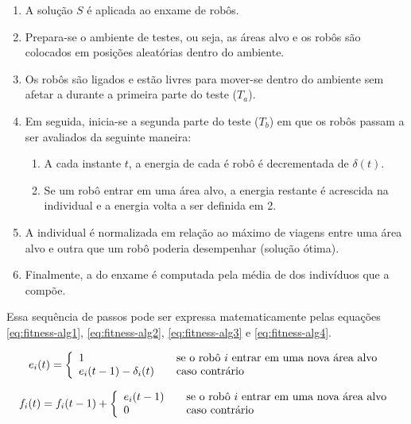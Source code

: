 \begin{enumerate}
    \item A solução $S$ é aplicada ao enxame de robôs.
    \item Prepara-se o ambiente de testes, ou seja, as áreas alvo e os robôs são colocados em posições aleatórias dentro do ambiente.
    \item Os robôs são ligados e estão livres para mover-se dentro do ambiente sem afetar a \fitness durante a primeira parte do teste ($T_{a}$).
    \item Em seguida, inicia-se a segunda parte do teste ($T_{b}$) em que os robôs passam a ser avaliados da seguinte maneira:
    \begin{enumerate}
        \item A cada instante $t$, a energia de cada é robô é decrementada de $\delta (t)$.
        \item Se um robô entrar em uma área alvo, a energia restante é acrescida na \fitness individual e a energia volta a ser definida em 2.
    \end{enumerate}
    \item A \fitness individual é normalizada em relação ao máximo de viagens entre uma área alvo e outra que um robô poderia desempenhar (solução ótima).
    \item Finalmente, a \fitness do enxame é computada pela média de \fitness dos indivíduos que a compõe.
\end{enumerate}

Essa sequência de passos pode ser expressa matematicamente pelas equações \ref{eq:fitness-alg1}, \ref{eq:fitness-alg2}, \ref{eq:fitness-alg3} e \ref{eq:fitness-alg4}.

\begin{equation}
\label{eq:fitness-alg1}
e_{i} (t) = \left\{
\begin{array}{l l}
1 & \quad \text{se o robô $i$ entrar em uma nova área alvo}\\
e_{i}(t - 1) - \delta_{i} (t) & \quad \text{caso contrário}
\end{array} \right.
\end{equation}

\begin{equation}
\label{eq:fitness-alg2}
f_{i} (t) = f_{i} (t - 1) + \left\{
\begin{array}{l l}
e_{i}(t - 1) & \quad \text{se o robô $i$ entrar em uma nova área alvo}\\
0 & \quad \text{caso contrário}
\end{array} \right.
\end{equation}

